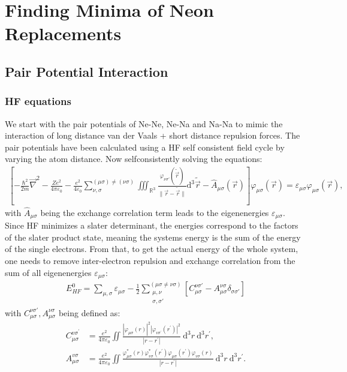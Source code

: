 
\chapter{Finding Minima of Neon Replacements}
\label{chap:Erstes Kapitel}
\section{Pair Potential Interaction}
\subsection{\ac{HF} equations}
We start with the pair potentials of Ne-Ne, Ne-Na and Na-Na to mimic the interaction of long distance van der Vaals + short distance repulsion forces. The pair potentials have been calculated using a \ac{HF} self consistent field cycle by varying the atom distance. Now selfconsistently solving the equations:\\
\begin{align}
	\left[-\frac{\hbar^2}{2m}\vec{\nabla}^2-\frac{Ze^2}{4\pi\varepsilon_0}-\frac{e^2}{4\varepsilon_0}\sum_{\nu,\sigma}^{(\mu\sigma)\neq(\nu\sigma)}\iiint_{\mathbb{R}^3}\frac{\varphi_{\nu\sigma'}(\tilde{\vec{r}})}{\|\vec{r}-\tilde{\vec{r}}\|}\mathrm{d}^3\tilde{\vec{r}}-\hat{A}_{\mu\sigma}(\vec{r})\right]\varphi_{\mu\sigma}(\vec{r})=\varepsilon_{\mu\sigma}\varphi_{\mu\sigma}(\vec{r}),
\end{align}
with $\hat{A}_{\mu\sigma}$ being the exchange correlation term leads to the eigenenergies $\varepsilon_{\mu\sigma}$. Since \ac{HF} 
minimizes a slater determinant, the energies correspond to the factors of the slater product state, meaning the systems energy is the sum of the energy of the single electrons. From that, to get the actual energy of the whole system, one needs to remove inter-electron repulsion and exchange correlation from the sum of all eigenenergies $\varepsilon_{\mu\sigma}$:
\begin{align}
	E_{HF}^0 = \sum_{\mu,\sigma}\varepsilon_{\mu\sigma}-\frac{1}{2}\sum_{\substack{\mu,\nu\\\sigma,\sigma'}}^{(\mu\sigma\neq\nu\sigma)}\left[C_{\mu\sigma}^{\nu\sigma'}-A_{\mu\sigma}^{\nu\sigma}\delta_{\sigma\sigma'}\right]
\end{align}
with $C_{\mu\sigma}^{\nu\sigma'},A_{\mu\sigma}^{\nu\sigma}$ being defined as:
\begin{align}
	C_{\mu \sigma}^{v \sigma^{\prime}}&=\frac{e^2}{4 \pi \varepsilon_0} \iint  \frac{\left|\varphi_{\mu \sigma}(r)\right|^2\left|\varphi_{v \sigma^{\prime}}\left(r^{\prime}\right)\right|^2}{\left|r-r^{\prime}\right|}\mathrm{~d}^3 r \mathrm{~d}^3 r^{\prime},
	\\
	A_{\mu \sigma}^{v \sigma}&=\frac{e^2}{4 \pi \varepsilon_0} \iint \frac{\varphi_{\mu \sigma}^*(r) \varphi_{v \sigma}^*\left(r^{\prime}\right) \varphi_{\mu \sigma}\left(r^{\prime}\right) \varphi_{v \sigma}(r)}{\left|r-r^{\prime}\right|} \mathrm{~d}^3 r \mathrm{~d}^3 r^{\prime}.
\end{align}
